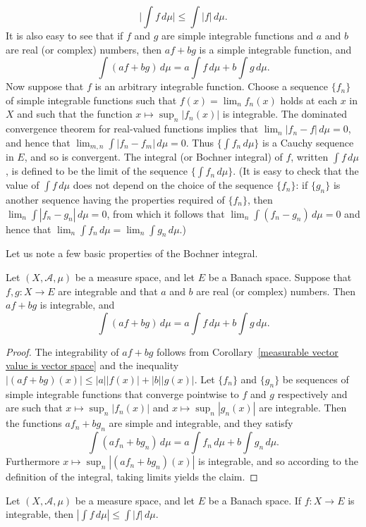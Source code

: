 \[\Big|\int f\,d\mu\Big|\leq\int|f|\,d\mu.\]
It is also easy to see that if $f$ and $g$ are simple integrable functions and $a$ and $b$ are real (or complex) numbers, then $af+bg$ is a simple integrable function, and
\[\int(af+bg)\,d\mu=a\int f\,d\mu+b\int g\,d\mu.\]
Now suppose that $f$ is an arbitrary integrable function. Choose a sequence $\{f_n\}$ of simple integrable functions such that $f(x)=\lim_nf_n(x)$ holds at each $x$ in $X$ and such that the function $x\mapsto\sup_n|f_n(x)|$ is integrable. The dominated convergence theorem for real-valued functions implies that $\lim_n|f_n-f|\,d\mu=0$, and hence that $\lim_{m,n}\int|f_n-f_m|\,d\mu=0$. Thus $\{\int f_n\,d\mu\}$ is a Cauchy sequence in $E$, and so is convergent. The integral (or Bochner integral) of $f$, written $\int f\,d\mu$, is defined to be the limit of the sequence $\{\int f_n\,d\mu\}$. (It is easy to check that the value of $\int f\,d\mu$ does not depend on the choice of the sequence $\{f_n\}$: if $\{g_n\}$ is another sequence having the properties required of $\{f_n\}$, then $\lim_n\int|f_n-g_n|\,d\mu=0$, from which it follows that $\lim_n\int(f_n-g_n)\,d\mu=0$ and hence that $\lim_n\int f_n\,d\mu=\lim_n\int g_n\,d\mu$.)\par
Let us note a few basic properties of the Bochner integral.
\begin{proposition}
Let $(X,\mathcal{A},\mu)$ be a measure space, and let $E$ be a Banach space. Suppose that $f,g:X\to E$ are integrable and that $a$ and $b$ are real (or complex) numbers. Then $af+bg$ is integrable, and
\[\int(af+bg)\,d\mu=a\int f\,d\mu+b\int g\,d\mu.\]
\end{proposition}
\begin{proof}
The integrability of $af+bg$ follows from Corollary~\ref{measurable vector value is vector space} and the inequality $|(af+bg)(x)|\leq|a||f(x)|+|b||g(x)|$. Let $\{f_n\}$ and $\{g_n
\}$ be sequences of simple integrable functions that converge pointwise to $f$ and $g$ respectively and are such that $x\mapsto\sup_n|f_n(x)|$ and $x\mapsto\sup_n|g_n(x)|$ are integrable. Then the functions $af_n+bg_n$ are simple and integrable, and they satisfy
\[\int(af_n+bg_n)\,d\mu=a\int f_n\,d\mu+b\int g_n\,d\mu.\]
Furthermore $x\mapsto\sup_n|(af_n+bg_n)(x)|$ is integrable, and so according to the definition of the integral, taking limits yields the claim.
\end{proof}
\begin{proposition}
Let $(X,\mathcal{A},\mu)$ be a measure space, and let $E$ be a Banach space. If $f:X\to E$ is integrable, then $|\int f\,d\mu|\leq\int|f|\,d\mu$.
\end{proposition}
